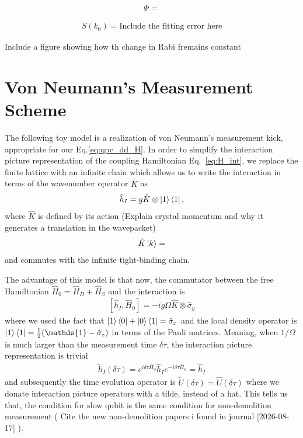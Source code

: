 \documentclass[10pt,
 amsmath,amssymb,
 aps,prb, twocolumn
]{revtex4-2}
\newcommand{\id}{\mathds{1}}
\newcommand\sj[1]{ {\color{cyan} #1} }
\begin{document}
\begin{align}\label{eq:app_schmidt_deco}
    \Phi = 
\end{align}

\begin{align}\label{eq:entropy_fit}
    S(k_0) = \text{Include the fitting error here}
\end{align}

 \sj{ Include a figure showing how th change in Rabi fremains constant}

 

\section{Von Neumann's Measurement Scheme}\label{app:derivation_backaction}

The following toy model is a realization of von Neumann's measurement kick, appropriate for our Eq.\eqref{eq:qpc_dd_H}. In order to simplify the interaction picture representation of the coupling Hamiltonian Eq.~\eqref{eq:H_int}, we replace the finite lattice with an infinite chain which allows us to write the interaction
in terms of the wavenumber operator $\hat{K}$ as
\begin{align}\label{eq:hint_toy}
    \hat{h}_I = g \hat{K} \otimes \ket{1}\bra{1},
\end{align}
where $\hat{K}$ is defined by its action \sj{(Explain crystal momentum and why it generates a translation in the wavepacket)}
\begin{align}
    \hat{K}\ket{k} = 
\end{align}
and commutes with the infinite tight-binding chain. 

The advantage of this model is that now, the commutator between the free Hamiltonian $\hat{H}_0 =\hat{H}_D + \hat{H}_S$ and the interaction is
\begin{align}
    \left[\hat{h}_I, \hat{H}_0 \right] = -ig\Omega \hat{K}\otimes\hat{\sigma}_y
\end{align}
where we used the fact that \mbox{$\ket{1}\bra{0}+\ket{0}\bra{1}=\hat{\sigma}_x$} and the local density operator is $\ket{1}\bra{1} = \frac{1}{2}(\id -\hat{\sigma}_z)$ in terms of the Pauli matrices. Meaning, when \mbox{$1/\Omega$} is much larger than the measurement time $\delta \tau$, the interaction picture representation is trivial
\begin{align}
    \tilde{h}_I(\delta \tau) = e^{i\delta\tau \hat{H}_0}\hat{h}_I e^{-i\delta\tau \hat{H}_0} = \hat{h}_I
\end{align}
and subsequently the time evolution operator is \mbox{$\tilde{U}(\delta\tau) = \hat{U}(\delta\tau)$} where we donate interaction picture operators with a tilde, instead of a hat. This tells us that, the condition for slow qubit is the same condition for non-demolition measurement (\sj{Cite the new non-demolition papers i found in journal [2026-08-17]}).
\end{document}
